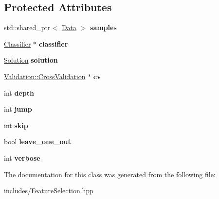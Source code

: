 \subsection*{Protected Attributes}
\begin{DoxyCompactItemize}
\item 
\mbox{\label{class_feature_selection_a4a0ac991f24cc098f22ad194a895e9d3}} 
std\+::shared\+\_\+ptr$<$ \hyperlink{class_data}{Data} $>$ {\bfseries samples}
\item 
\mbox{\label{class_feature_selection_ac829cbbee343c8c376406e67cd6ee288}} 
\hyperlink{class_classifier}{Classifier} $\ast$ {\bfseries classifier}
\item 
\mbox{\label{class_feature_selection_adc93dfa6122bc3c369c06321ad978095}} 
\hyperlink{class_solution}{Solution} {\bfseries solution}
\item 
\mbox{\label{class_feature_selection_a6f867268df53c3d21183800ad5194a7c}} 
\hyperlink{struct_validation_1_1_cross_validation}{Validation\+::\+Cross\+Validation} $\ast$ {\bfseries cv}
\item 
\mbox{\label{class_feature_selection_aee2d3b47761394fdb3bdd35f1ec09e1e}} 
int {\bfseries depth}
\item 
\mbox{\label{class_feature_selection_af8daf46dc4ff1d2177500444968a8b80}} 
int {\bfseries jump}
\item 
\mbox{\label{class_feature_selection_a87a16227b159a3b0bc255ec6b7c396b3}} 
int {\bfseries skip}
\item 
\mbox{\label{class_feature_selection_a434787bfaa9ad03ce5e370fc07dc2bc8}} 
bool {\bfseries leave\+\_\+one\+\_\+out}
\item 
\mbox{\label{class_feature_selection_ae531a07608a7b13051a16fb955be62fc}} 
int {\bfseries verbose}
\end{DoxyCompactItemize}


The documentation for this class was generated from the following file\+:\begin{DoxyCompactItemize}
\item 
includes/Feature\+Selection.\+hpp\end{DoxyCompactItemize}
